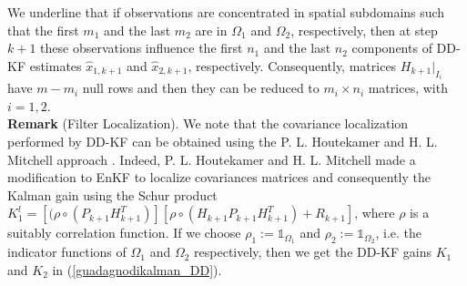 \documentclass[smallcondensed]{svjour3}
\begin{document}
\noindent We underline that if  observations are concentrated in spatial subdomains such that the first $m_{1}$ and the last $m_{2}$ are in  $\Omega_{1}$ and $\Omega_{2}$, respectively,  then at  step $k+1$  these observations influence the first $n_{1}$ and the last $n_{2}$ components of DD-KF estimates $\widehat{x}_{1,k+1}$ and $\widehat{x}_{2,k+1}$, respectively. Consequently,  matrices $H_{k+1}|_{I_{i}}$  have $m-m_{i}$ null rows and then they can be reduced to $m_{i}\times n_{i}$ matrices, with $i=1,2$. \\


\noindent \textbf{Remark} (Filter Localization).  We note that the covariance localization performed by  DD-KF can be obtained using the  P. L. Houtekamer and H. L. Mitchell approach \cite{H_M}. Indeed, P. L. Houtekamer and H. L. Mitchell  made a modification to  EnKF to localize covariances matrices  and consequently the Kalman gain using the Schur product $K_{1}^{l}=[(\rho \circ (P_{k+1}H_{k+1}^{T})][ \rho \circ(H_{k+1}P_{k+1}H_{k+1}^{T})+R_{k+1}]$, where $\rho$ is 
a suitably correlation function.  If we choose   $\rho_{1}:=\mathbb{1}_{\Omega_{1}}$ and $\rho_{2}:=\mathbb{1}_{\Omega_{2}}$, i.e. the indicator functions of  $\Omega_{1}$ and $\Omega_{2}$ respectively, then we get the DD-KF gains $K_{1}$ and $K_{2}$ in (\ref{guadagnodikalman_DD}).
 
\noindent
\end{document}

